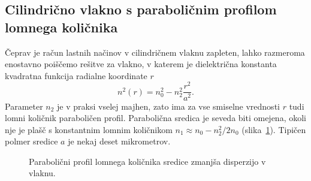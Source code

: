 \subsection{Cilindrično vlakno s paraboličnim profilom lomnega količnika}
Čeprav je račun lastnih načinov v cilindričnem vlaknu zapleten, lahko 
razmeroma enostavno poiščemo rešitve za vlakno, v katerem je dielektrična 
konstanta kvadratna funkcija radialne koordinate $r$
\begin{equation}
n^2\left(r\right)=n_{0}^{2}-n_{2}^{2}\frac{r^{2}}{a^2}.
\label{9.15}
\end{equation}
Parameter $n_{2}$ je v praksi vselej majhen, zato ima za vse smiselne
vrednosti $r$ tudi lomni količnik paraboličen profil. Parabolična
sredica je seveda biti omejena, okoli nje je plašč s konstantnim
lomnim količnikom $n_1 \approx n_0-n_2^2/2n_0$ (slika~\ref{fig:GRIN}). Tipičen polmer sredice $a$ je nekaj
deset mikrometrov.
\begin{figure}[h]
\centering
\def\svgwidth{90truemm} 
 
\caption{Parabolični profil lomnega količnika sredice zmanjša disperzijo v vlaknu.}
\label{fig:GRIN}
\end{figure}

